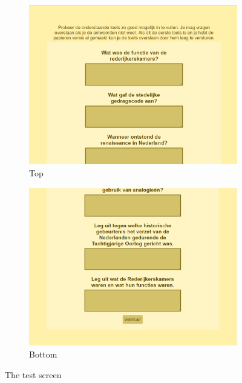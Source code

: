 \begin{figure}
    \begin{subfigure}{0.4\textwidth}
        \centering
        \includegraphics[width=\textwidth]{img/ui_test_top.png}
        \caption{Top}
        \label{fig:ui_test_top}
    \end{subfigure}
    \qquad
    \begin{subfigure}{0.4\textwidth}
        \centering
        \includegraphics[width=\textwidth]{img/ui_test_bottom.png}
        \caption{Bottom}
        \label{fig:ui_test_bottom}
    \end{subfigure}
    \caption{The test screen}
    \label{fig:ui_test}
\end{figure}

